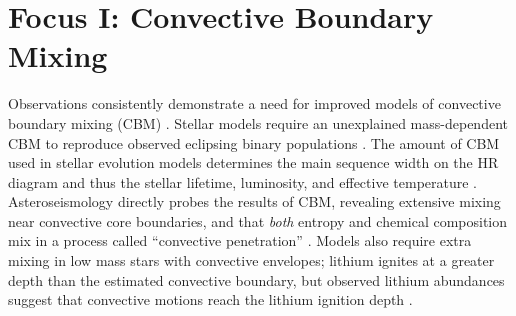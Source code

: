 \documentclass[12pt]{article}
\begin{document}
\section{Focus I: Convective Boundary Mixing}
Observations consistently demonstrate a need for improved models of convective boundary mixing (CBM) \citep{johnston2021}.
Stellar models require an unexplained mass-dependent CBM to reproduce observed eclipsing binary populations  \citep{claret_torres_2019}.
The amount of CBM used in stellar evolution models determines the main sequence width on the HR diagram and thus the stellar lifetime, luminosity, and effective temperature \citep{castro_etal_2014,higgins_vink_2019}.
Asteroseismology directly probes the results of CBM, revealing extensive mixing near convective core boundaries, and that \emph{both} entropy and chemical composition mix in a process called ``convective penetration'' \citep{michielsen_etal_2019, pedersen_etal_2021}.
Models also require extra mixing in low mass stars with convective envelopes; lithium ignites at a greater depth than the estimated convective boundary, but observed lithium abundances suggest that convective motions reach the lithium ignition depth  \citep{pinsonneault_1997,binks_etal_2022}.



%
\end{document}
